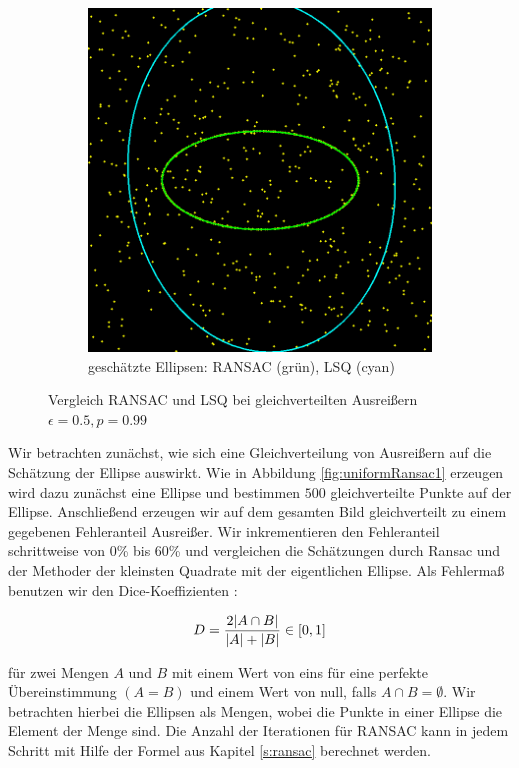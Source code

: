 {\begin{figure}[!htb]
\begin{subfigure}{.5\textwidth}
		\includegraphics[width=.9\textwidth]{images/ransac50_1.png}
		\caption{geschätzte Ellipsen: RANSAC (grün), LSQ (cyan)}
		\label{fig:uniformRansac2}
	\end{subfigure}
	\label{fig:uniformRansac}
	\caption{Vergleich RANSAC und LSQ bei gleichverteilten Ausreißern $\epsilon = 0.5, p = 0.99$}
\end{figure}

Wir betrachten zunächst, wie sich eine Gleichverteilung von Ausreißern auf die Schätzung der Ellipse auswirkt. Wie in Abbildung \ref{fig:uniformRansac1} erzeugen wird dazu zunächst eine Ellipse und bestimmen $500$ gleichverteilte Punkte auf der Ellipse. Anschließend erzeugen wir auf dem gesamten Bild gleichverteilt zu einem gegebenen Fehleranteil Ausreißer. Wir inkrementieren den Fehleranteil schrittweise von 0\% bis 60\% und vergleichen die Schätzungen durch Ransac und der Methoder der kleinsten Quadrate mit der eigentlichen Ellipse. Als Fehlermaß benutzen wir den Dice-Koeffizienten \cite{Dice1945}:

\[
	D = \frac{2\lvert A\cap B\rvert}{\lvert A\rvert + \lvert B\rvert} \in [0, 1]
\]

für zwei Mengen $A$ und $B$ mit einem Wert von eins für eine perfekte Übereinstimmung $(A = B)$ und einem Wert von null, falls $A\cap B = \emptyset$. Wir betrachten hierbei die Ellipsen als Mengen, wobei die Punkte in einer Ellipse die Element der Menge sind. Die Anzahl der Iterationen für RANSAC kann in jedem Schritt mit Hilfe der Formel aus Kapitel \ref{s:ransac} berechnet werden.

}
